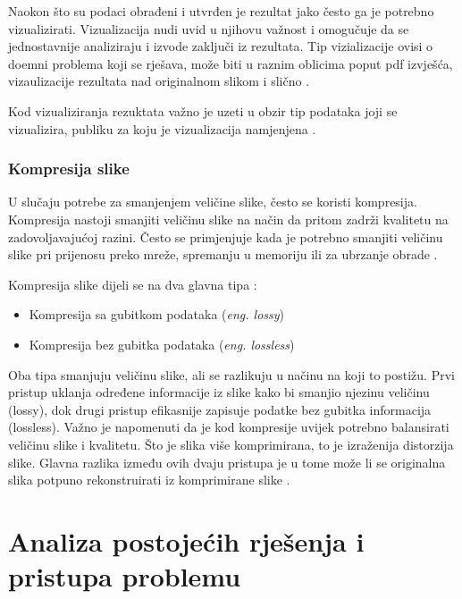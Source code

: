 \documentclass{foi}
\begin{document}
Naokon što su podaci obrađeni i utvrđen je rezultat jako često ga je potrebno vizualizirati. Vizualizacija nudi uvid u njihovu važnost i omogučuje da se jednostavnije analiziraju i izvode zaključi iz rezultata. 
Tip vizializacije ovisi o doemni problema koji se rješava, može biti u raznim oblicima poput pdf izvješća, vizaulizacije rezultata nad originalnom slikom i slično  \cite{Visulization}.

Kod vizualiziranja rezuktata važno je uzeti u obzir tip podataka joji se vizualizira, publiku za koju je vizualizacija namjenjena \cite{Visulization}. 

\subsubsection{Kompresija slike}

U slučaju potrebe za smanjenjem veličine slike, često se koristi kompresija. Kompresija nastoji smanjiti veličinu slike na način da pritom zadrži kvalitetu na zadovoljavajućoj razini. Često se primjenjuje kada je potrebno smanjiti veličinu slike pri prijenosu preko mreže, spremanju u memoriju ili za ubrzanje obrade \cite{ImageProcessing}.

\begin{flushleft}
Kompresija slike dijeli se na dva glavna tipa \cite{Compression}:
\begin{itemize}
    \item Kompresija sa gubitkom podataka (\textit{eng. lossy})
    \item Kompresija bez gubitka podataka (\textit{eng. lossless})
\end{itemize}
\end{flushleft}

Oba tipa smanjuju veličinu slike, ali se razlikuju u načinu na koji to postižu.  
Prvi pristup uklanja određene informacije iz slike kako bi smanjio njezinu veličinu (lossy), dok drugi pristup efikasnije zapisuje podatke bez gubitka informacija (lossless).  
Važno je napomenuti da je kod kompresije uvijek potrebno balansirati veličinu slike i kvalitetu. Što je slika više komprimirana, to je izraženija distorzija slike.  
Glavna razlika između ovih dvaju pristupa je u tome može li se originalna slika potpuno rekonstruirati iz komprimirane slike \cite{Compression}.

\pagebreak


\section{Analiza postojećih rješenja i pristupa problemu}
\end{document}

